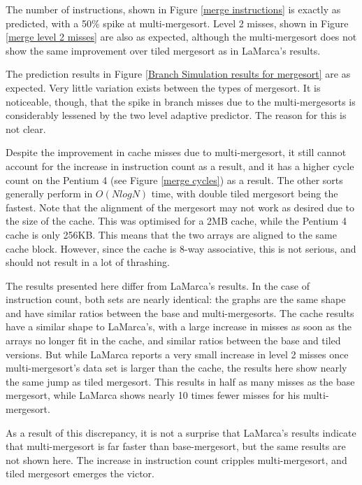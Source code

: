 
The number of instructions, shown in Figure \ref{merge instructions} is exactly
as predicted, with a 50\% spike at multi-mergesort. Level 2 misses, shown in
Figure \ref{merge level 2 misses} are also as expected, although the
multi-mergesort does not show the same improvement over tiled mergesort as in
LaMarca's results.

The prediction results in Figure \ref{Branch Simulation results for mergesort}
are as expected. Very little variation exists between the types of mergesort. It
is noticeable, though, that the spike in branch misses due to the
multi-mergesorts is considerably lessened by the two level adaptive predictor.
The reason for this is not clear.

Despite the improvement in cache misses due to multi-mergesort, it still cannot
account for the increase in instruction count as a result, and it has a higher
cycle count on the Pentium 4 (see Figure \ref{merge cycles}) as a result. The
other sorts generally perform in $O(NlogN)$ time, with double tiled mergesort
being the fastest. Note that the alignment of the mergesort may not work as
desired due to the size of the cache. This was optimised for a 2MB cache, while
the Pentium 4 cache is only 256KB. This means that the two arrays are aligned to
the same cache block. However, since the cache is 8-way associative, this is not
serious, and should not result in a lot of thrashing.

The results presented here differ from LaMarca's results. In the case of
instruction count, both sets are nearly identical: the graphs are the same shape
and have similar ratios between the base and multi-mergesorts. The cache results
have a similar shape to LaMarca's, with a large increase in misses as soon as
the arrays no longer fit in the cache, and similar ratios between the base and
tiled versions.  But while LaMarca reports a very small increase in level 2
misses once multi-mergesort's data set is larger than the cache, the results
here show nearly the same jump as tiled mergesort. This results in half as many
misses as the base mergesort, while LaMarca shows nearly 10 times fewer misses
for his multi-mergesort.

As a result of this discrepancy, it is not a surprise that LaMarca's results
indicate that multi-mergesort is far faster than base-mergesort, but the same
results are not shown here. The increase in instruction count cripples
multi-mergesort, and tiled mergesort emerges the victor.

